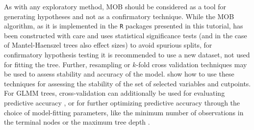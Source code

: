 \documentclass[doc,floatsintext,natbib]{apa7}
\begin{document}
As with any exploratory method, MOB should be considered as a tool for generating hypotheses and not as a confirmatory technique. While the MOB algorithm, as it is implemented in the \texttt{R} packages presented in this tutorial, has been constructed with care and uses statistical significance tests (and in the case of Mantel-Haenszel trees also effect sizes) to avoid spurious splits, for confirmatory hypothesis testing it is recommended to use a new dataset, not used for fitting the tree. Further, resampling or $k$-fold cross validation techniques may be used to assess stability and accuracy of the model. \cite{PhilyRusc18} show how to use these techniques for assessing the stability of the set of selected variables and cutpoints. For GLMM trees, cross-validation can additionally be used for evaluating predictive accuracy \citep[e.g., ][]{RooiyWeed20}, or for further optimizing predictive accuracy through the choice of model-fitting parameters, like the minimum number of observations in the terminal nodes or the maximum tree depth \citep{JameyWitt23}.  

\end{document}
